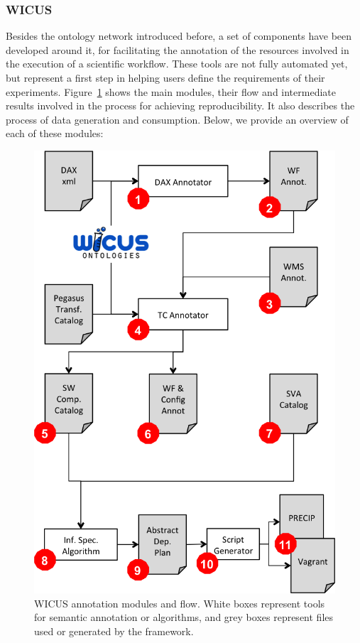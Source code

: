 \subsubsection{WICUS}
\label{subsec:wicus}

Besides the ontology network introduced before, a set of components have been developed around it, 
for facilitating the annotation of the resources involved in the execution of a scientific workflow. 
These tools are not fully automated yet, but represent a first step in helping users define the requirements of their 
experiments. Figure~\ref{fig:wicusflow} shows the main modules, their flow and intermediate 
results involved in the process for achieving reproducibility. It also describes the process of 
data generation and consumption. Below, we provide an overview of each of these modules:

\begin{figure}[!htb]
	\centering
	\includegraphics[width=.8\linewidth]{figures/wicusflow}
	\caption{WICUS annotation modules and flow. White boxes represent tools for semantic annotation or algorithms, and grey boxes represent files used or generated by the framework.}
	\label{fig:wicusflow}
\end{figure}

